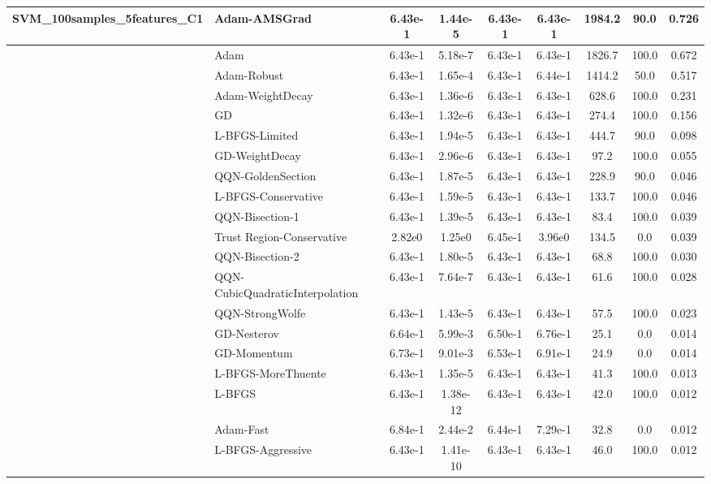 \documentclass[10pt]{article}
\begin{document}
\begin{longtable}{|l|l|c|c|c|c|c|c|c|}
SVM\_100samples\_5features\_C1 & \textbf{Adam-AMSGrad} & 6.43e-1 & 1.44e-5 & 6.43e-1 & 6.43e-1 & 1984.2 & 90.0 & 0.726 \\
\hline
 & Adam & 6.43e-1 & 5.18e-7 & 6.43e-1 & 6.43e-1 & 1826.7 & 100.0 & 0.672 \\
\hline
 & Adam-Robust & 6.43e-1 & 1.65e-4 & 6.43e-1 & 6.44e-1 & 1414.2 & 50.0 & 0.517 \\
\hline
 & Adam-WeightDecay & 6.43e-1 & 1.36e-6 & 6.43e-1 & 6.43e-1 & 628.6 & 100.0 & 0.231 \\
\hline
 & GD & 6.43e-1 & 1.32e-6 & 6.43e-1 & 6.43e-1 & 274.4 & 100.0 & 0.156 \\
\hline
 & L-BFGS-Limited & 6.43e-1 & 1.94e-5 & 6.43e-1 & 6.43e-1 & 444.7 & 90.0 & 0.098 \\
\hline
 & GD-WeightDecay & 6.43e-1 & 2.96e-6 & 6.43e-1 & 6.43e-1 & 97.2 & 100.0 & 0.055 \\
\hline
 & QQN-GoldenSection & 6.43e-1 & 1.87e-5 & 6.43e-1 & 6.43e-1 & 228.9 & 90.0 & 0.046 \\
\hline
 & L-BFGS-Conservative & 6.43e-1 & 1.59e-5 & 6.43e-1 & 6.43e-1 & 133.7 & 100.0 & 0.046 \\
\hline
 & QQN-Bisection-1 & 6.43e-1 & 1.39e-5 & 6.43e-1 & 6.43e-1 & 83.4 & 100.0 & 0.039 \\
\hline
 & Trust Region-Conservative & 2.82e0 & 1.25e0 & 6.45e-1 & 3.96e0 & 134.5 & 0.0 & 0.039 \\
\hline
 & QQN-Bisection-2 & 6.43e-1 & 1.80e-5 & 6.43e-1 & 6.43e-1 & 68.8 & 100.0 & 0.030 \\
\hline
 & QQN-CubicQuadraticInterpolation & 6.43e-1 & 7.64e-7 & 6.43e-1 & 6.43e-1 & 61.6 & 100.0 & 0.028 \\
\hline
 & QQN-StrongWolfe & 6.43e-1 & 1.43e-5 & 6.43e-1 & 6.43e-1 & 57.5 & 100.0 & 0.023 \\
\hline
 & GD-Nesterov & 6.64e-1 & 5.99e-3 & 6.50e-1 & 6.76e-1 & 25.1 & 0.0 & 0.014 \\
\hline
 & GD-Momentum & 6.73e-1 & 9.01e-3 & 6.53e-1 & 6.91e-1 & 24.9 & 0.0 & 0.014 \\
\hline
 & L-BFGS-MoreThuente & 6.43e-1 & 1.35e-5 & 6.43e-1 & 6.43e-1 & 41.3 & 100.0 & 0.013 \\
\hline
 & L-BFGS & 6.43e-1 & 1.38e-12 & 6.43e-1 & 6.43e-1 & 42.0 & 100.0 & 0.012 \\
\hline
 & Adam-Fast & 6.84e-1 & 2.44e-2 & 6.44e-1 & 7.29e-1 & 32.8 & 0.0 & 0.012 \\
\hline
 & L-BFGS-Aggressive & 6.43e-1 & 1.41e-10 & 6.43e-1 & 6.43e-1 & 46.0 & 100.0 & 0.012 \\

\end{longtable}
\end{document}
